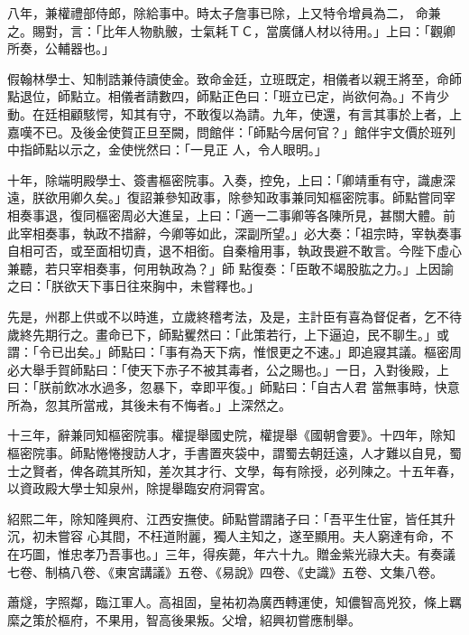 \begin{pinyinscope}
 八年，兼權禮部侍郎，除給事中。時太子詹事已除，上又特令增員為二，
 命兼之。賜對，言：「比年人物骫骳，士氣耗ＴＣ，當廣儲人材以待用。」上曰：「觀卿所奏，公輔器也。」



 假翰林學士、知制誥兼侍讀使金。致命金廷，立班既定，相儀者以親王將至，命師點退位，師點立。相儀者請數四，師點正色曰：「班立已定，尚欲何為。」不肯少動。在廷相顧駭愕，知其有守，不敢復以為請。九年，使還，有言其事於上者，上嘉嘆不已。及後金使賀正旦至闕，問館伴：「師點今居何官？」館伴宇文價於班列中指師點以示之，金使恍然曰：「一見正
 人，令人眼明。」



 十年，除端明殿學士、簽書樞密院事。入奏，控免，上曰：「卿靖重有守，識慮深遠，朕欲用卿久矣。」復詔兼參知政事，除參知政事兼同知樞密院事。師點嘗同宰相奏事退，復同樞密周必大進呈，上曰：「適一二事卿等各陳所見，甚關大體。前此宰相奏事，執政不措辭，今卿等如此，深副所望。」必大奏：「祖宗時，宰執奏事自相可否，或至面相切責，退不相銜。自秦檜用事，執政畏避不敢言。今陛下虛心兼聽，若只宰相奏事，何用執政為？」師
 點復奏：「臣敢不竭股肱之力。」上因諭之曰：「朕欲天下事日往來胸中，未嘗釋也。」



 先是，州郡上供或不以時進，立歲終稽考法，及是，主計臣有喜為督促者，乞不待歲終先期行之。畫命已下，師點矍然曰：「此策若行，上下逼迫，民不聊生。」或謂：「令已出矣。」師點曰：「事有為天下病，惟恨更之不速。」即追寢其議。樞密周必大舉手賀師點曰：「使天下赤子不被其毒者，公之賜也。」一日，入對後殿，上曰：「朕前飲冰水過多，忽暴下，幸即平復。」師點曰：「自古人君
 當無事時，快意所為，忽其所當戒，其後未有不悔者。」上深然之。



 十三年，辭兼同知樞密院事。權提舉國史院，權提舉《國朝會要》。十四年，除知樞密院事。師點惓惓搜訪人才，手書置夾袋中，謂蜀去朝廷遠，人才難以自見，蜀士之賢者，俾各疏其所知，差次其才行、文學，每有除授，必列陳之。十五年春，以資政殿大學士知泉州，除提舉臨安府洞霄宮。



 紹熙二年，除知隆興府、江西安撫使。師點嘗謂諸子曰：「吾平生仕宦，皆任其升沉，初未嘗容
 心其間，不枉道附麗，獨人主知之，遂至顯用。夫人窮達有命，不在巧圖，惟忠孝乃吾事也。」三年，得疾薨，年六十九。贈金紫光祿大夫。有奏議七卷、制槁八卷、《東宮講議》五卷、《易說》四卷、《史識》五卷、文集八卷。



 蕭燧，字照鄰，臨江軍人。高祖固，皇祐初為廣西轉運使，知儂智高兇狡，條上羈縻之策於樞府，不果用，智高後果叛。父增，紹興初嘗應制舉。




\end{pinyinscope}

